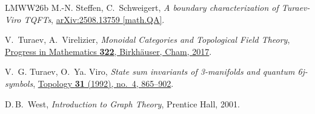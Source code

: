 \documentclass[11pt]{amsart}
\theoremstyle{definition}
\numberwithin{equation}{section}
\newcommand\arxiv[2]      {\href{http://arXiv.org/abs/#1}{arXiv:#2}}
\newcommand\doi[2]        {\href{http://dx.doi.org/#1}{#2}}
\begin{document}
\begin{thebibliography}{LMWW26b}
M.-N. Steffen, C.~Schweigert,
\textsl{A boundary characterization of Turaev-Viro TQFTs},
\arxiv{2508.13759}{2508.13759 [math.QA]}.

V.~Turaev, A.~Virelizier,
\textsl{Monoidal Categories and Topological Field Theory},
\doi{10.1007/978-3-319-49834-8}{Progress in Mathematics \textbf{322}, Birkh\"auser, Cham, 2017}.

V.~G. Turaev, O.~Ya. Viro,
\textsl{State sum invariants of 3-manifolds and quantum 6j-symbols},
\doi{10.1016/0040-9383(92)90015-A}{Topology \textbf{31} (1992), no.~4, 865--902}.

D.\,B.~West, \textsl{Introduction to Graph Theory}, Prentice Hall, 2001.

\end{thebibliography}
\end{document}
